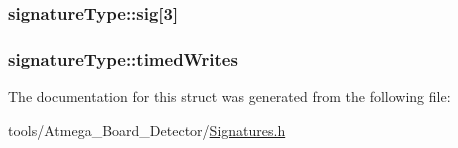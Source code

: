 \hypertarget{structsignatureType_a3d5f31e69660e3fd3b84934160100916}{
\subsubsection[{sig}]{ signature\-Type\-::sig\mbox{[}3\mbox{]}}}\label{structsignatureType_a3d5f31e69660e3fd3b84934160100916}
\hypertarget{structsignatureType_af2757a76a18782b155f68ad533c89a17}{
\subsubsection[{timed\-Writes}]{ signature\-Type\-::timed\-Writes}}\label{structsignatureType_af2757a76a18782b155f68ad533c89a17}


The documentation for this struct was generated from the following file\-:\begin{DoxyCompactItemize}
\item 
tools/\-Atmega\-\_\-\-Board\-\_\-\-Detector/\hyperlink{Signatures_8h}{Signatures.\-h}\end{DoxyCompactItemize}
